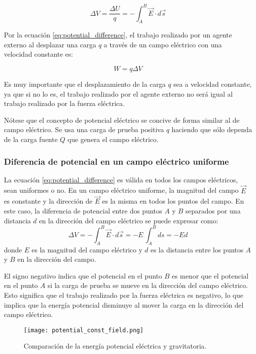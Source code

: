 \begin{equation}
    \Delta V = \frac{\Delta U}{q} = -\int_A^B \vec{E} \cdot d\vec{s}
    \label{eq:potential_difference}
\end{equation}

Por la ecuación \eqref{eq:potential_difference}, el trabajo realizado por un agente externo al desplazar una carga \(q\) a través de un campo eléctrico con una velocidad constante es:

\[
W=q\Delta V
\]

Es muy importante que el desplazamiento de la carga \(q\) sea a velocidad constante, ya que si no lo es, el trabajo realizado por el agente externo no será igual al trabajo realizado por la fuerza eléctrica. 

Nótese que el concepto de potencial eléctrico se concive de forma similar al de campo eléctrico. Se usa una carga de prueba positiva \(q\) haciendo que sólo dependa de la carga fuente \(Q\) que genera el campo eléctrico. 

\subsubsection{Diferencia de potencial en un campo eléctrico uniforme}

La ecuación \eqref{eq:potential_difference} es válida en todos los campos eléctricos, sean uniformes o no. En un campo eléctrico uniforme, la magnitud del campo \(\vec{E}\) es constante y la dirección de \(\vec{E}\) es la misma en todos los puntos del campo. En este caso, la diferencia de potencial entre dos puntos \(A\) y \(B\) separados por una distancia \(d\) en la dirección del campo eléctrico se puede expresar como:
\begin{equation}
    \Delta V = -\int_A^B \vec{E} \cdot d\vec{s} = -E \, \int_A^B ds = \boxed{-Ed}
    \label{eq:potential_uniform}
\end{equation}
donde \(E\) es la magnitud del campo eléctrico y \(d\) es la distancia entre los puntos \(A\) y \(B\) en la dirección del campo.

El signo negativo indica que el potencial en el punto \(B\) es menor que el potencial en el punto \(A\) si la carga de prueba se mueve en la dirección del campo eléctrico. Esto significa que el trabajo realizado por la fuerza eléctrica es negativo, lo que implica que la energía potencial disminuye al mover la carga en la dirección del campo eléctrico.

\begin{figure}[ht]
    \centering
    \texttt{[image: potential\_const\_field.png]}
    \caption{Comparación de la energía potencial eléctrica y gravitatoria.}
    \label{fig:potential_uniform}
\end{figure}

